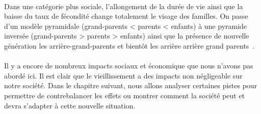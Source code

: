 \paragraph{}Dans une catégorie plus sociale, l’allongement de la durée de vie ainsi que la baisse du taux de fécondité change totalement le visage des familles. On passe d’un modèle pyramidale (grand-parents < parents < enfants) à une pyramide inversée  (grand-parents > parents > enfants) ainsi que la présence de nouvelle génération les arrière-grand-parents et bientôt les arrière arrière grand parents~\citep[pp.13]{thesis}.

\paragraph{}Il y a encore de nombreux impacts sociaux et économique que nous n’avons pas abordé ici. Il est clair que le vieillissement a des impacts non négligeable sur notre société. Dans le chapitre suivant, nous allons analyser certaines pistes pour permettre de contrebalancer les effets ou montrer comment la société peut et devra s’adapter à cette nouvelle situation. 
 

 
